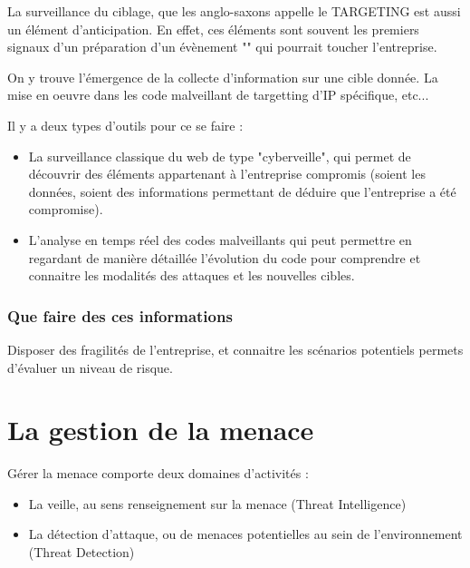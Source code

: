 
La surveillance du ciblage, que les anglo-saxons appelle le TARGETING est aussi un élément d'anticipation. 
En effet, ces éléments sont souvent les premiers signaux d'un préparation d'un évènement "" qui pourrait toucher l'entreprise.

On y trouve l'émergence de la collecte d'information sur une cible donnée. La mise en oeuvre dans les code malveillant de targetting d'IP spécifique, etc...

Il y a deux types d'outils pour ce se faire : 

\begin{itemize}
	\item La surveillance classique du web de type "cyberveille", qui permet de découvrir des éléments appartenant à l'entreprise compromis (soient les données, soient des informations permettant de déduire que l'entreprise a été compromise).
	\item L'analyse en temps réel des codes malveillants qui peut permettre en regardant de manière détaillée l'évolution du code pour comprendre et connaitre les modalités des attaques et les nouvelles cibles.
\end{itemize}


\subsubsection{Que faire des ces informations}

Disposer des fragilités de l'entreprise, et connaitre les scénarios potentiels permets d'évaluer un niveau de risque. 


\section{La gestion de la menace}

Gérer la menace comporte deux domaines d'activités :

\begin{itemize}
  \item La veille, au sens renseignement sur la menace (Threat Intelligence)
  \item La détection d'attaque, ou de menaces potentielles au sein de l'environnement (Threat Detection)
\end{itemize}



